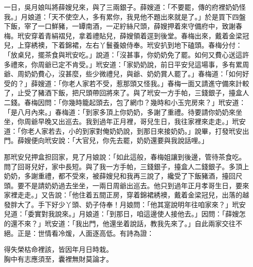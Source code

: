 一日，吳月娘叫將薛嫂兒來，與了三兩銀子。{}薛嫂道：「不要罷，傳的府裡奶奶怪我。」月娘道：「天不使空人，多有累你，我見他不題出來就是了。」於是買下四盤下飯，宰了一口鮮豬，一罈南酒，一疋紵絲尺頭，薛嫂押着來守備府中，致謝春梅。玳安穿着青絹褶兒，拿着禮貼兒，薛嫂領着逕到後堂。春梅出來，戴着金梁冠兒，上穿綉襖，下着錦裙，左右丫鬟養娘侍奉。玳安扒到地下磕頭。春梅分付：「放桌兒，擺茶食與玳安吃。」說道：「沒甚事，你奶奶免了罷。如何又費心送這許多禮來，你周爺已定不肯受。」玳安道：「家奶奶說，前日平安兒這場事，多有累周爺、周奶奶費心，沒甚麼，些少微禮兒，與爺、奶奶賞人罷了。」春梅道：「如何好受的？」薛嫂道：「你老人家若不受，惹那頭又怪我。」春梅一面又請進守備來計較了，止受了豬酒下飯，把尺頭帶回將來了。與了玳安一方手帕，三錢銀子，擡盒人二錢。春梅因問：「你幾時籠起頭去，包了網巾？幾時和小玉完房來？」{}玳安道：「是八月內來。」春梅道：「到家多頂上你奶奶，多謝了重禮。待要請你奶奶來坐坐，你周爺早晚又出巡去。我到過年正月裡，哥兒生日，我往家裡來走走。」玳安道：「你老人家若去，小的到家對俺奶奶說，到那日來接奶奶。」說畢，打發玳安出門。薛嫂便向玳安說：「大官兒，你先去罷，奶奶還要與我說話哩。」

那玳安兒押盒担回家，見了月娘說：「如此這般，春梅姐讓到後邊，管待茶食吃。問了回哥兒好，家中長短。與了我一方手帕，三錢銀子，擡盒人二錢銀子。多頂上奶奶，多謝重禮，都不受來，被薛嫂兒和我再三說了，纔受了下飯豬酒，擡回尺頭。要不是請奶奶過去坐坐，一兩日周爺出巡去。他只到過年正月孝哥生日，要來家裡走走。」又告說：「他住着五間正房，穿着錦裙綉襖，戴着金梁冠兒，出落的越發胖大了。手下好少丫頭、奶子侍奉！月娘問：「他其寔說明年往咱家來？」{}玳安兒道：「委實對我說來。」月娘道：「到那日，咱這邊使人接他去。」因問：「薛嫂怎的還不來？」玳安道：「我出門，他還坐着說話，教我先來了。」自此兩家交往不絕。正是：世情看冷煖，人面逐高低。有詩為證：

\begin{myquote}
得失榮枯命裡該，皆因年月日時栽。\\胸中有志應須至，囊裡無財莫論才。
\end{myquote}

